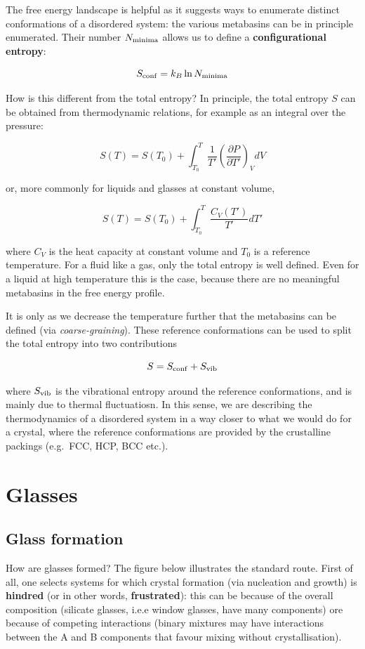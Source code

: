 \documentclass[
  letterpaper,
  enabledeprecatedfontcommands]{report}
\begin{document}
The free energy landscape is helpful as it suggests ways to enumerate
distinct conformations of a disordered system: the various metabasins
can be in principle enumerated. Their number \(N_{\rm minima}\) allows
us to define a \textbf{configurational entropy}:

\[
S_{\rm conf} = k_B \ln N_{\rm minima}
\]

How is this different from the total entropy? In principle, the total
entropy \(S\) can be obtained from thermodynamic relations, for example
as an integral over the pressure:

\[
S(T) = S(T_0) + \int_{T_0}^{T} \frac{1}{T'} \left( \frac{\partial P}{\partial T'} \right)_V dV
\]

or, more commonly for liquids and glasses at constant volume,

\[
S(T) = S(T_0) + \int_{T_0}^{T} \frac{C_V(T')}{T'} dT'
\]

where \(C_V\) is the heat capacity at constant volume and \(T_0\) is a
reference temperature. For a fluid like a gas, only the total entropy is
well defined. Even for a liquid at high temperature this is the case,
because there are no meaningful metabasins in the free energy profile.

It is only as we decrease the temperature further that the metabasins
can be defined (via \emph{coarse-graining}). These reference
conformations can be used to split the total entropy into two
contributions

\[S = S_{\rm conf}+S_{\rm vib}\]

where \(S_{\rm vib}\) is the vibrational entropy around the reference
conformations, and is mainly due to thermal fluctuatiosn. In this sense,
we are describing the thermodynamics of a disordered system in a way
closer to what we would do for a crystal, where the reference
conformations are provided by the crustalline packings (e.g.~FCC, HCP,
BCC etc.).

\section{Glasses}\label{glasses-1}

\subsection{Glass formation}\label{glass-formation}

How are glasses formed? The figure below illustrates the standard route.
First of all, one selects systems for which crystal formation (via
nucleation and growth) is \textbf{hindred} (or in other words,
\textbf{frustrated}): this can be because of the overall composition
(silicate glasses, i.e.e window glasses, have many components) ore
because of competing interactions (binary mixtures may have interactions
between the A and B components that favour mixing without
crystallisation).
\end{document}
